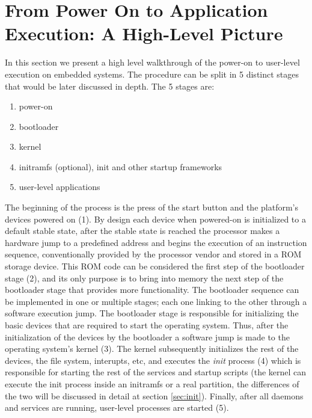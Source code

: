 
\section{From Power On to Application Execution: A High-Level Picture}

In this section we present a high level walkthrough of the power-on to user-level execution on embedded systems. The procedure can be split in 5 distinct stages that would be later discussed in depth. The 5 stages are:

\begin{enumerate}
 \item power-on
 \item bootloader
 \item kernel
 \item initramfs (optional), init and other startup frameworks
 \item user-level applications
\end{enumerate}

The beginning of the process is the press of the start button and the platform's devices powered on (1). By design each device when powered-on is initialized to a default stable state, after the stable state is reached the processor makes a hardware jump to a predefined address and begins the execution of an instruction sequence, conventionally provided by the processor vendor and stored in a ROM storage device. This ROM code can be considered the first step of the bootloader stage (2), and its only purpose is to bring into memory the next step of the bootloader stage that provides more functionality. The bootloader sequence can be implemented in one or multiple stages; each one linking to the other through a software execution jump. The bootloader stage is responsible for initializing the basic devices that are required to start the operating system. Thus, after the initialization of the devices by the bootloader a software jump is made to the operating system's kernel (3). The kernel subsequently initializes the rest of the devices, the file system, interupts, etc, and executes the \textit{init} process (4) which is responsible for starting the rest of the services and startup scripts (the kernel can execute the init process inside an initramfs or a real partition, the differences of the two will be discussed in detail at section \ref{sec:init}). Finally, after all daemons and services are running, user-level processes are started (5).


